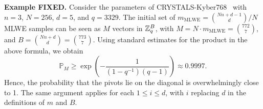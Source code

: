 \noindent
\textbf{Example FIXED.} 
Consider the parameters of CRYSTALS-Kyber768~\cite{NISTPQC:CRYSTALS-KYBER22} with \(n = 3\), \(N = 256\), \(d = 5\), and \(q = 3329\). 
The initial set of $m_{\text{MLWE}} = \binom{Nn+d-1}{d}/N$ MLWE samples can be seen as \(M\) vectors in \(\mathbb{Z}_q^B\), with $M = N\cdot m_{\text{MLWE}} = \binom{772}{7}$, and \(B = \binom{Nn+d}{d} = \binom{773}{7} \).
Using standard estimates for the product in the above formula, we obtain
\begin{equation*}
\mathbb{P}_M \ge \exp\left(-\frac{1}{(1-q^{-1})(q-1)}\right) \approx 0.9997.
\end{equation*}
Hence, the probability that the pivots lie on the diagonal is overwhelmingly close to 1. 
The same argument applies for each $1 \le i \le d$, with $i$ replacing $d$ in the definitions of $m$ and $B$.
